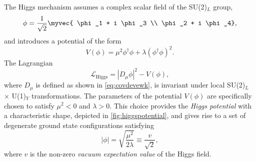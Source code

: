 
The Higgs mechanism assumes a complex scalar field of the SU(2)$_L$ group,
\begin{equation}
  \phi = \frac{1}{\sqrt{2}} \myvec { \phi_1 + i \phi_3 \\ \phi_2 + i \phi_4},
\end{equation}
and introduces a potential of the form
\begin{equation}
  V(\phi) = \mu^2\phi^\dagger\phi + \lambda \left(\phi^\dagger\phi \right)^2.
  \label{eq:higgspotential}
\end{equation}
The Lagrangian 
\begin{equation}
  \mathcal{L}_{\text{Higgs}} = |D_\mu\phi|^2 - V(\phi), %
  \label{eq:lagrangianhiggs}
\end{equation}
where $D_\mu$ is defined as shown in \cref{eq:covdevewk}, is invariant under local SU(2)$_L$ $\times$ U(1)$_Y$ transformations.
The parameters of the potential $V(\phi)$ are specifically chosen to satisfy $\mu^2 < 0$ and $\lambda > 0$.
This choice provides the \emph{Higgs potential} with a characteristic shape, depicted in \cref{fig:higgspotential}, and gives rise to a set of degenerate ground state configurations satisfying
\begin{equation}
  |\phi| = \sqrt{ \frac{\mu^2}{2\lambda} } \equiv \frac{ v }{\sqrt{2}},
  \label{eq:higgsminima}
\end{equation}
where $v$ is the non-zero \emph{vacuum expectation value} of the Higgs field.
